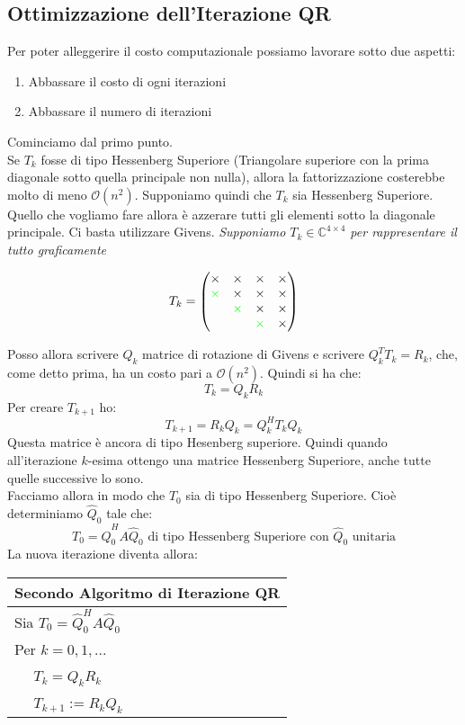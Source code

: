 \documentclass[11pt,a4paper,twoside]{article}
\theoremstyle{definition}
\begin{document}
\subsection{Ottimizzazione dell'Iterazione QR}

Per poter alleggerire il costo computazionale possiamo lavorare sotto due aspetti:
\begin{enumerate}
	\item Abbassare il costo di ogni iterazioni
	\item Abbassare il numero di iterazioni
\end{enumerate}

Cominciamo dal primo punto.\\
Se $T_k$ fosse di tipo Hessenberg Superiore (Triangolare superiore con la prima diagonale sotto quella principale non nulla), allora la fattorizzazione costerebbe molto di meno $\mathcal O(n^2)$.
Supponiamo quindi che $T_k$ sia Hessenberg Superiore. Quello che vogliamo fare allora è azzerare tutti gli elementi sotto la diagonale principale. Ci basta utilizzare Givens. \textit{Supponiamo $T_k \in \mathbb C^{4 \times 4}$ per rappresentare il tutto graficamente}

\[
	T_{k} = \begin{pmatrix} \times & \times & \times & \times\\
	{\color{green} \times} & \times & \times & \times\\
	& {\color{green} \times} & \times & \times\\
	&& {\color{green} \times} & \times\end{pmatrix}
\]

Posso allora scrivere $Q_k$ matrice di rotazione di Givens e scrivere $Q_k^T T_k = R_k$, che, come detto prima, ha un costo pari a $\mathcal O(n^2)$. Quindi si ha che:
\[ T_k = Q_k R_k \]
Per creare $T_{k+1}$ ho:
\[T_{k+1} = R_k Q_k = Q_k^H T_k Q_k\]
Questa matrice è ancora di tipo Hesenberg superiore. Quindi quando all'iterazione $k$-esima ottengo una matrice Hessenberg Superiore, anche tutte quelle successive lo sono.\\
Facciamo allora in modo che $T_0$ sia di tipo Hessenberg Superiore. Cioè determiniamo $\hat Q_0$ tale che:
\[T_0 = \hat Q_0^H A \hat Q_0 \text{ di tipo Hessenberg Superiore con } \hat Q_0 \text{ unitaria}\]
La nuova iterazione diventa allora:

\begin{tabular}{l}
	\\
	\textbf{Secondo Algoritmo di Iterazione QR}\\
	\hline
	Sia $T_0 = \hat Q_0^HA \hat Q_0$\\
	Per $k = 0,1,...$\\
	$\quad$ $T_k = Q_kR_k$\\
	$\quad$ $T_{k+1} := R_kQ_k$\\
\end{tabular}
\end{document}
